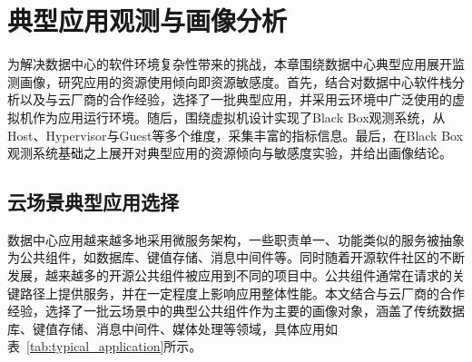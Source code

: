 \chapter{典型应用观测与画像分析}\label{chap:profiling}





为解决数据中心的软件环境复杂性带来的挑战，本章围绕数据中心典型应用展开监测画像，研究应用的资源使用倾向即资源敏感度。首先，结合对数据中心软件栈分析以及与云厂商的合作经验，选择了一批典型应用，并采用云环境中广泛使用的虚拟机作为应用运行环境。随后，围绕虚拟机设计实现了Black Box观测系统，从Host、Hypervisor与Guest等多个维度，采集丰富的指标信息。最后，在Black Box观测系统基础之上展开对典型应用的资源倾向与敏感度实验，并给出画像结论。

\section{云场景典型应用选择}



数据中心应用越来越多地采用微服务架构，一些职责单一、功能类似的服务被抽象为公共组件，如数据库、键值存储、消息中间件等。同时随着开源软件社区的不断发展，越来越多的开源公共组件被应用到不同的项目中。公共组件通常在请求的关键路径上提供服务，并在一定程度上影响应用整体性能。本文结合与云厂商的合作经验，选择了一批云场景中的典型公共组件作为主要的画像对象，涵盖了传统数据库、键值存储、消息中间件、媒体处理等领域，具体应用如表~\ref{tab:typical_application}所示。

